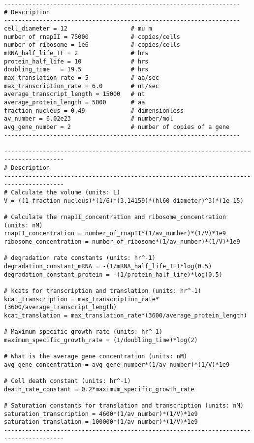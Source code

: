 \lstset{basicstyle=\tiny,style=myCustomMatlabStyle}
\begin{lstlisting}
-------------------------------------------------------------------
# Description
-------------------------------------------------------------------
cell_diameter = 12                	# mu m
number_of_rnapII = 75000          	# copies/cells
number_of_ribosome = 1e6          	# copies/cells
mRNA_half_life_TF = 2             	# hrs
protein_half_life = 10            	# hrs
doubling_time 	= 19.5         		# hrs
max_translation_rate = 5          	# aa/sec
max_transcription_rate = 6.0       	# nt/sec
average_transcript_length = 15000 	# nt
average_protein_length = 5000     	# aa
fraction_nucleus = 0.49           	# dimensionless
av_number = 6.02e23               	# number/mol
avg_gene_number = 2               	# number of copies of a gene
-------------------------------------------------------------------

---------------------------------------------------------------------------------------
# Description
---------------------------------------------------------------------------------------
# Calculate the volume (units: L)
V = ((1-fraction_nucleus)*(1/6)*(3.14159)*(hl60_diameter)^3)*(1e-15)

# Calculate the rnapII_concentration and ribosome_concentration (units: nM)
rnapII_concentration = number_of_rnapII*(1/av_number)*(1/V)*1e9
ribosome_concentration = number_of_ribosome*(1/av_number)*(1/V)*1e9

# degradation rate constants (units: hr^-1)
degradation_constant_mRNA = -(1/mRNA_half_life_TF)*log(0.5)
degradation_constant_protein = -(1/protein_half_life)*log(0.5)

# kcats for transcription and translation (units: hr^-1)
kcat_transcription = max_transcription_rate*(3600/average_transcript_length)
kcat_translation = max_translation_rate*(3600/average_protein_length)

# Maximum specific growth rate (units: hr^-1)
maximum_specific_growth_rate = (1/doubling_time)*log(2)

# What is the average gene concentration (units: nM)
avg_gene_concentration = avg_gene_number*(1/av_number)*(1/V)*1e9

# Cell death constant (units: hr^-1)
death_rate_constant = 0.2*maximum_specific_growth_rate

# Saturation constants for translation and transcription (units: nM)
saturation_transcription = 4600*(1/av_number)*(1/V)*1e9
saturation_translation = 100000*(1/av_number)*(1/V)*1e9
---------------------------------------------------------------------------------------

\end{lstlisting}

